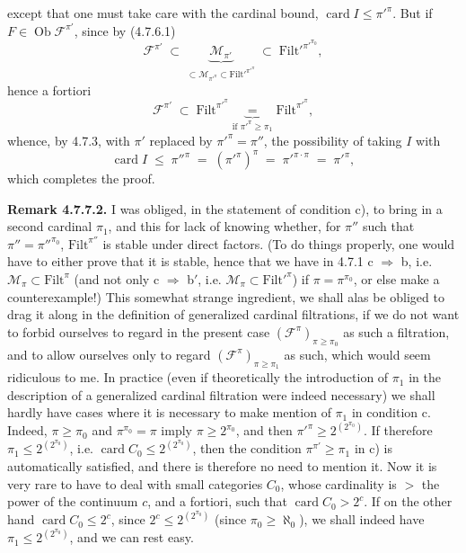 \documentclass[11pt]{article}
\newcommand{\printedpage}[1]{\marginpar{\footnotesize p.~#1}}
\newcommand{\msp}[1]{\marginpar{\footnotesize [#1]}}
\newcommand{\Ob}{\operatorname{Ob}}
\newcommand{\Filt}{\mathrm{Filt}}
\newcommand{\card}{\operatorname{card}}
\begin{document}
\noindent\printedpage{59}
except that one must take care with the cardinal bound, $\card I \leqslant \pi'^{\pi}$. But if $F \in \Ob\mathcal{F}^{\pi'}$, since by (4.7.6.1)
\[
\mathcal{F}^{\pi'} \;\subset\; \underbrace{\mathcal{M}_{\pi'}}_{\subset\mathcal{M}_{\pi'^{\pi}}\subset\Filt'^{\pi'^{\pi}}} \;\subset\; \Filt'^{\pi'^{\pi_0}} ,
\]
hence a fortiori
\[
\mathcal{F}^{\pi'} \;\subset\; \Filt^{\pi'^{\pi}} \underbrace{\;=\;}_{\text{if } \pi'^{\pi}\geqslant\pi_1} \Filt^{\pi'^{\pi}} , %
\]
whence, by 4.7.3, with $\pi'$ replaced by $\pi'^{\pi}=\pi''$, the possibility of taking $I$ with
\[
\card I \;\leqslant\; \pi''^{\pi} \;=\; (\pi'^{\pi})^{\pi} \;=\; \pi'^{\pi\cdot\pi} \;=\; \pi'^{\pi} ,
\]
which completes the proof.

\noindent\msp{page 175}\textbf{Remark 4.7.7.2.} I was obliged, in the statement of condition c), to bring in a second cardinal $\pi_1$, and this for lack of knowing whether, for $\pi''$ such that $\pi''=\pi''^{\pi_0}$, $\Filt^{\pi''}$ is stable under direct factors. (To do things properly, one would have to either prove that it is stable, hence that we have in 4.7.1 c $\Longrightarrow$ b, i.e. $\mathcal{M}_\pi\subset\Filt^{\pi}$ (and not only c $\Longrightarrow$ b$'$, i.e. $\mathcal{M}_\pi\subset\Filt'^{\pi}$) if $\pi=\pi^{\pi_0}$, or else make a counterexample!) This somewhat strange ingredient, we shall alas be obliged to drag it along in the definition of generalized cardinal filtrations, if we do not want to forbid ourselves to regard in the present case $(\mathcal{F}^{\pi})_{\pi\geqslant\pi_0}$ as such a filtration, and to allow ourselves only to regard $(\mathcal{F}^{\pi})_{\pi\geqslant\pi_1}$ as such, which would seem ridiculous to me. In practice (even if theoretically the introduction of $\pi_1$ in the description of a generalized cardinal filtration were indeed necessary) we shall hardly have cases where it is necessary to make mention of $\pi_1$ in condition c. Indeed, $\pi\geqslant\pi_0$ and $\pi^{\pi_0}=\pi$ imply $\pi\geqslant 2^{\pi_0}$, and then $\pi'^{\pi}\geqslant 2^{(2^{\pi_0})}$. If therefore $\pi_1\leqslant 2^{(2^{\pi_0})}$, i.e. $\card C_0\leqslant 2^{(2^{\pi_0})}$, then the condition $\pi^{\pi'}\geqslant\pi_1$ in c) is automatically satisfied, and there is therefore no need to mention it. Now it is very rare to have to deal with small categories $C_0$, whose cardinality is $>$ the power %
\msp{page 176}
of the continuum $c$, and a fortiori, such that $\card C_0 > 2^{c}$. If on the other hand $\card C_0\leqslant 2^{c}$, since $2^{c}\leqslant 2^{(2^{\pi_0})}$ (since $\pi_0\geqslant\aleph_0$), we shall indeed have $\pi_1\leqslant 2^{(2^{\pi_0})}$, and we can rest easy.
\end{document}
